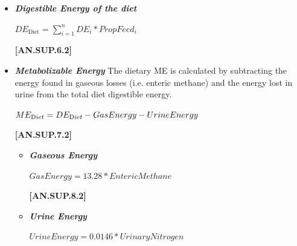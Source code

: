\begin{refsection}
\begin{itemize}
    \item \textbf{\textit{Digestible Energy of the diet}} 
    \vspace{0.25cm}
    \begin{center}
    \(DE_{\text{Diet}} = \sum_{i=1}^{n} DE_{i} *PropFeed_{i} \)
    \end{center}
    \vspace{0.5cm}
    
            {\raggedleft \textbf{[AN.SUP.6.2]}\par}
            \vspace{0.5cm}

    \item \textbf{\textit{Metabolizable Energy}} 
    \vspace{0.25cm}
The dietary ME is calculated by subtracting the energy found in gaseous losses (i.e. enteric methane) and the energy lost in urine from the total diet digestible energy. 
\vspace{0.5cm}
            \begin{center}
            \(ME_{\text Diet} = DE_{\text Diet} - GasEnergy - UrineEnergy\)
            \end{center}
            \vspace{0.5cm}
    
            {\raggedleft \textbf{[AN.SUP.7.2]}\par}
            \vspace{0.5cm}
   
    \begin{itemize}
        \item \textbf{\textit{Gaseous Energy}}
            \vspace{0.25cm}
            \begin{center}
            \(GasEnergy = 13.28 * EntericMethane \)
            \end{center}
            \vspace{0.5cm}
    
            {\raggedleft \textbf{[AN.SUP.8.2]}\par}
            \vspace{0.5cm}
            \vspace{0.5cm}
        \item \textbf{\textit{Urine Energy}}
        \vspace{0.25cm}
            \begin{center}
            \(UrineEnergy = 0.0146* UrinaryNitrogen\)
            \end{center}
            \vspace{0.5cm}
    

\end{itemize}
\end{itemize}
\end{refsection}
